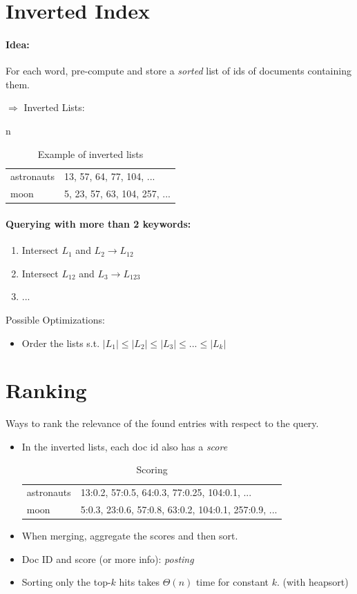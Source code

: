 \documentclass[a4paper]{scrartcl}
\begin{document}
\section{Inverted Index}
\paragraph{Idea:} For each word, pre-compute and store a \emph{sorted} list of
ids of documents containing them.

$\Rightarrow$ Inverted Lists:
\begin{table}[!htbp]n
  \centering
  \caption{Example of inverted lists}
  \label{tab:inverted_list}
  \begin{tabular}{ll}
  astronauts& 13, 57, 64, 77, 104, ... \\
  moon & 5, 23, 57, 63, 104, 257, ...
  \end{tabular}
\end{table}


\paragraph{Querying with more than 2 keywords:}
\begin{enumerate}
\item Intersect $L_1$ and $L_2\rightarrow L_{12}$
\item Intersect $L_{12}$ and $L_3\rightarrow L_{123}$
\item ...
\end{enumerate}
Possible Optimizations:
\begin{itemize}
\item Order the lists s.t. $|L_1|\le|L_2|\le|L_3|\le...\le|L_k|$
\end{itemize}

\section{Ranking}
Ways to rank the relevance of the found entries with respect to the query.
\begin{itemize}
\item In the inverted lists, each doc id also has a \emph{score}
  \begin{table}[!htbp]
    \centering
    \caption{Scoring}
    \label{tab:scored_list}
    \begin{tabular}{ll}
      astronauts& 13:0.2, 57:0.5, 64:0.3, 77:0.25, 104:0.1, ... \\
      moon & 5:0.3, 23:0.6, 57:0.8, 63:0.2, 104:0.1, 257:0.9, ...
    \end{tabular}
  \end{table}
\item When merging, aggregate the scores and then sort.
\item Doc ID and score (or more info): \emph{posting}
\item Sorting only the top-$k$ hits takes $\Theta(n)$ time for constant $k$.
  (with heapsort)
\end{itemize}
\end{document}
